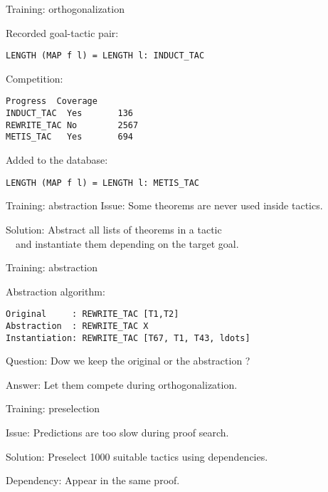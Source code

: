 \documentclass{beamer}
\begin{document}
\begin{frame}[fragile]{Training: orthogonalization}

Recorded goal-tactic pair:
\begin{lstlisting}[language=SMLSmall]
LENGTH (MAP f l) = LENGTH l: INDUCT_TAC
\end{lstlisting}

Competition:
\begin{lstlisting}[language=SMLSmall]
            Progress  Coverage 
INDUCT_TAC  Yes       136
REWRITE_TAC No        2567
METIS_TAC   Yes       694
\end{lstlisting}

Added to the database:
\begin{lstlisting}[language=SMLSmall]
LENGTH (MAP f l) = LENGTH l: METIS_TAC
\end{lstlisting}
\end{frame}

\begin{frame}{Training: abstraction}
Issue: Some theorems are never used inside tactics.

\vspace{5mm}

Solution: Abstract all lists of theorems in a tactic\\ \ \ 
and instantiate them depending on the target goal.
\end{frame}

\begin{frame}[fragile]{Training: abstraction}

Abstraction algorithm:
\begin{lstlisting}[language=SMLSmall]
Original     : REWRITE_TAC [T1,T2]
Abstraction  : REWRITE_TAC X
Instantiation: REWRITE_TAC [T67, T1, T43, ldots]
\end{lstlisting}

\vspace{5mm}

Question: Dow we keep the original or the abstraction ?\\

\vspace{5mm}

Answer: Let them compete during orthogonalization.\\

\end{frame}

\begin{frame}{Training: preselection}

Issue: Predictions are too slow during proof search.

\vspace{5mm}

Solution: Preselect 1000 suitable tactics using dependencies.

\vspace{5mm}

Dependency: Appear in the same proof.

\end{frame}
\end{document}
